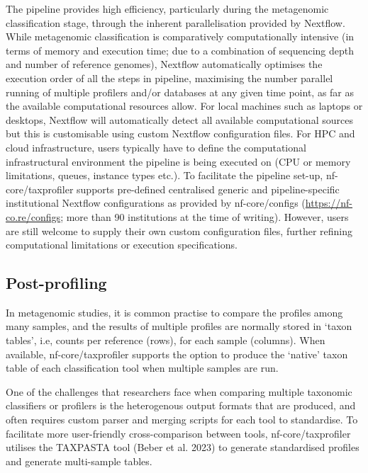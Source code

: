 \documentclass[
]{article}
\begin{document}
The pipeline provides high efficiency, particularly during the
metagenomic classification stage, through the inherent parallelisation
provided by Nextflow. While metagenomic classification is comparatively
computationally intensive (in terms of memory and execution time; due to
a combination of sequencing depth and number of reference genomes),
Nextflow automatically optimises the execution order of all the steps in
pipeline, maximising the number parallel running of multiple profilers
and/or databases at any given time point, as far as the available
computational resources allow. For local machines such as laptops or
desktops, Nextflow will automatically detect all available computational
sources but this is customisable using custom Nextflow configuration
files. For HPC and cloud infrastructure, users typically have to define
the computational infrastructural environment the pipeline is being
executed on (CPU or memory limitations, queues, instance types etc.). To
facilitate the pipeline set-up, nf-core/taxprofiler supports pre-defined
centralised generic and pipeline-specific institutional Nextflow
configurations as provided by nf-core/configs
(\url{https://nf-co.re/configs}; more than 90 institutions at the time
of writing). However, users are still welcome to supply their own custom
configuration files, further refining computational limitations or
execution specifications.

\hypertarget{post-profiling}{%
\subsection{Post-profiling}\label{post-profiling}}

In metagenomic studies, it is common practise to compare the profiles
among many samples, and the results of multiple profiles are normally
stored in `taxon tables', i.e, counts per reference (rows), for each
sample (columns). When available, nf-core/taxprofiler supports the
option to produce the `native' taxon table of each classification tool
when multiple samples are run.

One of the challenges that researchers face when comparing multiple
taxonomic classifiers or profilers is the heterogenous output formats
that are produced, and often requires custom parser and merging scripts
for each tool to standardise. To facilitate more user-friendly
cross-comparison between tools, nf-core/taxprofiler utilises the
TAXPASTA tool (Beber et al. 2023) to generate standardised profiles and
generate multi-sample tables.
\end{document}
